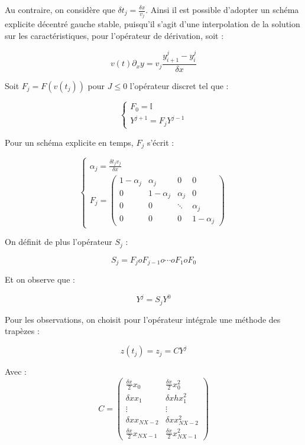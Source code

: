 \documentclass[a4paper]{article}
\begin{document}
Au contraire, on considère que $\displaystyle \delta t_j = \frac{\delta x}{v_{j}} $.
Ainsi il est possible d'adopter un schéma explicite décentré gauche stable, puisqu'il s'agit d'une interpolation de la solution sur les caractéristiques, pour l'opérateur de dérivation, soit :

\[ v(t)\partial_x y = v_j \frac{y_{i+1}^j - y_{i}^j}{\delta x} \]

Soit $F_j = F(v(t_j))$ pour $J \leq 0$ l'opérateur discret tel que :

\[ \begin{cases}
F_0 = \mathbb{I} \\
Y^{j+1} = F_j Y^{j-1} 
\end{cases}\]

Pour un schéma explicite en temps, $F_j$ s'écrit :

\[
\begin{cases}
	\alpha_j = \frac{\delta t_j v_{j}}{\delta x}  \\
	 F_j  =\left( \begin{array}{cccc}
	1-\alpha_j &    \alpha_j   &  0     & 0 \\
	0      & 1-\alpha_j   & \alpha_j   & 0 \\
	0      &   0     & \ddots &  \alpha_j \\
	0      & 0       &0        & 1-\alpha_j
	 \end{array} \right)
\end{cases}
\]

On définit de plus l'opérateur $S_j$ :

\[ S_j = F_j o F_{j-1} o \cdots o F_1 o F_0 \]

Et on observe que :

\[ Y^j= S_j Y^0\]

Pour les observations, on choisit pour l'opérateur intégrale une méthode des trapèzes :

\[ z(t_j) = z_j = CY^j\]

Avec :
\[
C =  \left( \begin{array}{cc}
	\frac{\delta x}{2} x_0       &  \frac{\delta x}{2}x_0^2   \\
	\delta x x_1       &  \delta xh x_1^2   \\
	\vdots      & \vdots     \\
	\delta x x_{NX-2}  & \delta xx_{NX-2}^2\\
    \frac{\delta x}{2} x_{NX-1}  & \frac{\delta x}{2} x_{NX-1}^2
	 \end{array} \right)
\]
\end{document}
